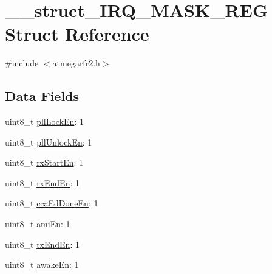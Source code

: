 \hypertarget{struct____struct___i_r_q___m_a_s_k___r_e_g}{\section{\-\_\-\-\_\-struct\-\_\-\-I\-R\-Q\-\_\-\-M\-A\-S\-K\-\_\-\-R\-E\-G Struct Reference}
\label{struct____struct___i_r_q___m_a_s_k___r_e_g}
}


{\ttfamily \#include $<$atmegarfr2.\-h$>$}

\subsection*{Data Fields}
\begin{DoxyCompactItemize}
\item 
uint8\-\_\-t \hyperlink{struct____struct___i_r_q___m_a_s_k___r_e_g_a0da327bdffafbb01846d129cf2dffd4d}{pll\-Lock\-En}\-: 1
\item 
uint8\-\_\-t \hyperlink{struct____struct___i_r_q___m_a_s_k___r_e_g_a57140a618ef21de2eeb7a943a1aad2b3}{pll\-Unlock\-En}\-: 1
\item 
uint8\-\_\-t \hyperlink{struct____struct___i_r_q___m_a_s_k___r_e_g_a3c6f7218c81a0121cbe97296c0409db4}{rx\-Start\-En}\-: 1
\item 
uint8\-\_\-t \hyperlink{struct____struct___i_r_q___m_a_s_k___r_e_g_a505c555d82593b86f1d74f2006bbe606}{rx\-End\-En}\-: 1
\item 
uint8\-\_\-t \hyperlink{struct____struct___i_r_q___m_a_s_k___r_e_g_a7a6c643587096f01cba7e0b3f4003836}{cca\-Ed\-Done\-En}\-: 1
\item 
uint8\-\_\-t \hyperlink{struct____struct___i_r_q___m_a_s_k___r_e_g_a7b75f0daf375cb8d2e24121c15bbf1a6}{ami\-En}\-: 1
\item 
uint8\-\_\-t \hyperlink{struct____struct___i_r_q___m_a_s_k___r_e_g_a29ace7559f42257c6cb29faafe7baa7c}{tx\-End\-En}\-: 1
\item 
uint8\-\_\-t \hyperlink{struct____struct___i_r_q___m_a_s_k___r_e_g_a2f4546ec1505561c600986812c436245}{awake\-En}\-: 1
\end{DoxyCompactItemize}


